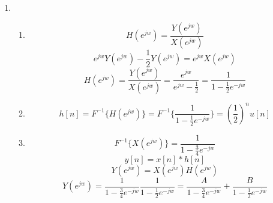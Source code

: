 \documentclass[10pt,a4paper, margin=1in]{article}
\begin{document}
\begin{enumerate}
\begin{enumerate}
    \end{enumerate}
\item %
	\begin{enumerate}
    \item %
    \begin{equation}
        H(e^{jw}) = \frac{Y(e^{jw})}{X(e^{jw})}
    \end{equation}
    \begin{equation}
        e^{jw}Y(e^{jw}) -\frac{1}{2}Y(e^{jw}) = e^{jw}X(e^{jw})
    \end{equation}
    \begin{equation}
        H(e^{jw}) = \frac{Y(e^{jw})}{X(e^{jw})} = \frac{e^{jw}}{e^{jw}-\frac{1}{2}} = \frac{1}{1-\frac{1}{2}e^{-jw}}
    \end{equation}
    \item %
    \begin{equation}
        h[n] = F^{-1}\{H(e^{jw})\} = F^{-1}\{\frac{1}{1-\frac{1}{2}e^{-jw}}\}  = (\frac{1}{2})^nu[n]
    \end{equation}
	\item %
    \begin{equation}
        F^{-1}\{X(e^{jw})\} = \frac{1}{1 - \frac{3}{4}e^{-jw}}
    \end{equation}
    \begin{equation}
        y[n] = x[n] * h[n]
    \end{equation}
    \begin{equation}
        Y(e^{jw}) = X(e^{jw})H(e^{jw})
    \end{equation}
    \begin{equation}
        Y(e^{jw}) = \frac{1}{1 - \frac{3}{4}e^{-jw}}\frac{1}{1 - \frac{1}{2}e^{-jw}} = \frac{A}{1 - \frac{3}{4}e^{-jw}} + \frac{B}{1 - \frac{1}{2}e^{-jw}}

\end{equation}
\end{enumerate}
\end{enumerate}
\end{document}
